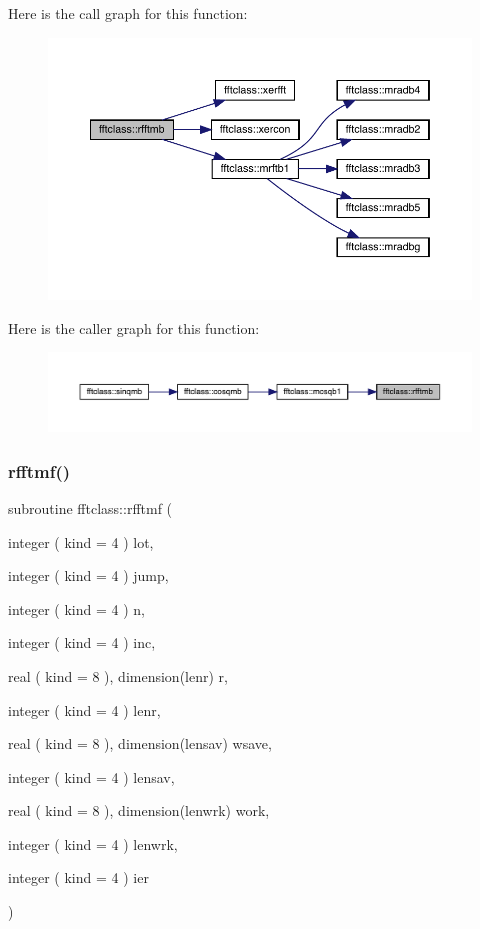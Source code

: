 Here is the call graph for this function\+:\nopagebreak
\begin{figure}[H]
\begin{center}
\leavevmode
\includegraphics[width=350pt]{namespacefftclass_acc4295c5a3646519e26c3dd5ae66418d_cgraph}
\end{center}
\end{figure}
Here is the caller graph for this function\+:\nopagebreak
\begin{figure}[H]
\begin{center}
\leavevmode
\includegraphics[width=350pt]{namespacefftclass_acc4295c5a3646519e26c3dd5ae66418d_icgraph}
\end{center}
\end{figure}
\mbox{\label{namespacefftclass_a4662111bc784aa321b0567a1a0578963}} 
\subsubsection{\texorpdfstring{rfftmf()}{rfftmf()}}
{\footnotesize\ttfamily subroutine fftclass\+::rfftmf (\begin{DoxyParamCaption}\item[{integer ( kind = 4 )}]{lot,  }\item[{integer ( kind = 4 )}]{jump,  }\item[{integer ( kind = 4 )}]{n,  }\item[{integer ( kind = 4 )}]{inc,  }\item[{real ( kind = 8 ), dimension(lenr)}]{r,  }\item[{integer ( kind = 4 )}]{lenr,  }\item[{real ( kind = 8 ), dimension(lensav)}]{wsave,  }\item[{integer ( kind = 4 )}]{lensav,  }\item[{real ( kind = 8 ), dimension(lenwrk)}]{work,  }\item[{integer ( kind = 4 )}]{lenwrk,  }\item[{integer ( kind = 4 )}]{ier }\end{DoxyParamCaption})}

